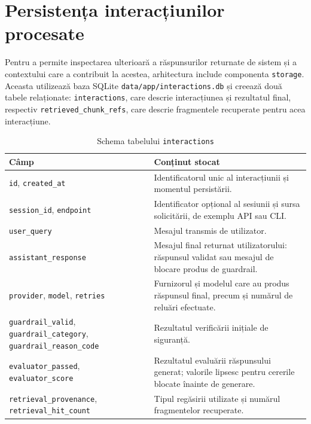 \documentclass[12pt, a4paper, oneside, romanian]{teza-upb}
\begin{document}
\section{Persistența interacțiunilor procesate}

Pentru a permite inspectarea ulterioară a răspunsurilor returnate de sistem și a contextului care a contribuit la acestea, arhitectura include componenta \texttt{storage}. Aceasta utilizează baza SQLite \texttt{data/app/interactions.db} și creează două tabele relaționate: \texttt{interactions}, care descrie interacțiunea și rezultatul final, respectiv \texttt{retrieved\_chunk\_refs}, care descrie fragmentele recuperate pentru acea interacțiune.

\begin{table}[H]
\centering
\caption{Schema tabelului \texttt{interactions}}
\begin{tabular}{|p{4cm}|p{9.2cm}|}
\hline
\textbf{Câmp} & \textbf{Conținut stocat} \\
\hline
\texttt{id}, \texttt{created\_at} & Identificatorul unic al interacțiunii și momentul persistării. \\
\hline
\texttt{session\_id}, \texttt{endpoint} & Identificator opțional al sesiunii și sursa solicitării, de exemplu API sau CLI. \\
\hline
\texttt{user\_query} & Mesajul transmis de utilizator. \\
\hline
\texttt{assistant\_response} & Mesajul final returnat utilizatorului: răspunsul validat sau mesajul de blocare produs de guardrail. \\
\hline
\texttt{provider}, \texttt{model}, \texttt{retries} & Furnizorul și modelul care au produs răspunsul final, precum și numărul de reluări efectuate. \\
\hline
\texttt{guardrail\_valid}, \texttt{guardrail\_category}, \texttt{guardrail\_reason\_code} & Rezultatul verificării inițiale de siguranță. \\
\hline
\texttt{evaluator\_passed}, \texttt{evaluator\_score} & Rezultatul evaluării răspunsului generat; valorile lipsesc pentru cererile blocate înainte de generare. \\
\hline
\texttt{retrieval\_provenance}, \texttt{retrieval\_hit\_count} & Tipul regăsirii utilizate și numărul fragmentelor recuperate. \\
\hline
\end{tabular}
\label{tab:interaction-storage}
\end{table}
\end{document}
